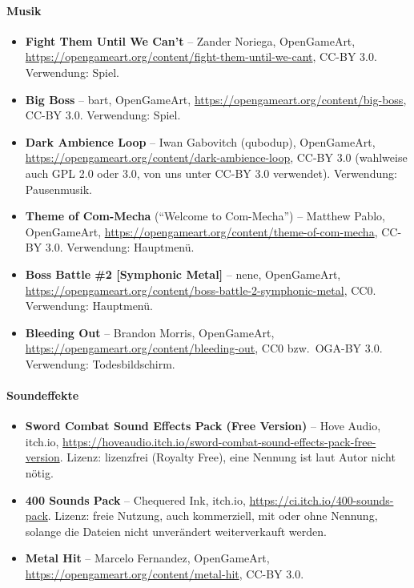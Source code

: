 \documentclass[../Main.tex]{subfiles}
\begin{document}
\paragraph{Musik}
\begin{itemize}[leftmargin=1.5cm]
\item \textbf{Fight Them Until We Can't} -- Zander Noriega, OpenGameArt, \url{https://opengameart.org/content/fight-them-until-we-cant}, CC-BY 3.0. Verwendung: Spiel.
\item \textbf{Big Boss} -- bart, OpenGameArt, \url{https://opengameart.org/content/big-boss}, CC-BY 3.0. Verwendung: Spiel.
\item \textbf{Dark Ambience Loop} -- Iwan Gabovitch (qubodup), OpenGameArt, \url{https://opengameart.org/content/dark-ambience-loop}, CC-BY 3.0 (wahlweise auch GPL 2.0 oder 3.0, von uns unter CC-BY 3.0 verwendet). Verwendung: Pausenmusik.
\item \textbf{Theme of Com-Mecha} (\enquote{Welcome to Com-Mecha}) -- Matthew Pablo, OpenGameArt, \url{https://opengameart.org/content/theme-of-com-mecha}, CC-BY 3.0. Verwendung: Hauptmenü.
\item \textbf{Boss Battle \#2 [Symphonic Metal]} -- nene, OpenGameArt, \url{https://opengameart.org/content/boss-battle-2-symphonic-metal}, CC0. Verwendung: Hauptmenü.
\item \textbf{Bleeding Out} -- Brandon Morris, OpenGameArt, \url{https://opengameart.org/content/bleeding-out}, CC0 bzw.\ OGA-BY 3.0. Verwendung: Todesbildschirm.
\end{itemize}

\paragraph{Soundeffekte}
\begin{itemize}[leftmargin=1.5cm]
\item \textbf{Sword Combat Sound Effects Pack (Free Version)} -- Hove Audio, itch.io, \url{https://hoveaudio.itch.io/sword-combat-sound-effects-pack-free-version}. Lizenz: lizenzfrei (Royalty Free), eine Nennung ist laut Autor nicht nötig.
\item \textbf{400 Sounds Pack} -- Chequered Ink, itch.io, \url{https://ci.itch.io/400-sounds-pack}. Lizenz: freie Nutzung, auch kommerziell, mit oder ohne Nennung, solange die Dateien nicht unverändert weiterverkauft werden.
\item \textbf{Metal Hit} -- Marcelo Fernandez, OpenGameArt, \url{https://opengameart.org/content/metal-hit}, CC-BY 3.0.
\end{itemize}
\end{document}
